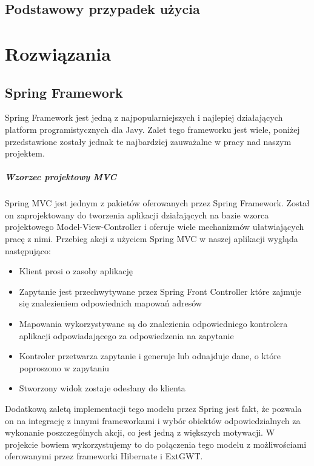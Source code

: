 \documentclass[licencjacka]{pracamgr}
\begin{document}
\section{Podstawowy przypadek użycia}

\chapter{Rozwiązania}
\section{Spring Framework}

Spring Framework jest jedną z najpopularniejszych i najlepiej działających platform programistycznych dla Javy. Zalet tego frameworku jest wiele, poniżej przedstawione zostały jednak te najbardziej zauważalne w pracy nad naszym projektem.

\paragraph{Wzorzec projektowy MVC}
Spring MVC jest jednym z pakietów oferowanych przez Spring Framework. Został on zaprojektowany do tworzenia aplikacji działających na bazie wzorca projektowego Model-View-Controller i oferuje wiele mechanizmów ułatwiających pracę z nimi. Przebieg akcji z użyciem Spring MVC w naszej aplikacji wygląda następująco:

\begin{itemize}
  \item Klient prosi o zasoby aplikację
  \item Zapytanie jest przechwytywane przez Spring Front Controller które zajmuje się znalezieniem odpowiednich mapowań adresów
  \item Mapowania wykorzystywane są do znalezienia odpowiedniego kontrolera aplikacji odpowiadającego za odpowiedzenia na zapytanie
  \item Kontroler przetwarza zapytanie i generuje lub odnajduje dane, o które poproszono w zapytaniu
  \item Stworzony widok zostaje odesłany do klienta
\end{itemize}

Dodatkową zaletą implementacji tego modelu przez Spring jest fakt, że pozwala on na integrację z innymi frameworkami i wybór obiektów odpowiedzialnych za wykonanie poszczególnych akcji, co jest jedną z większych motywacji. W projekcie bowiem wykorzystujemy to do połączenia tego modelu z możliwościami oferowanymi przez frameworki Hibernate i ExtGWT.
\end{document}
